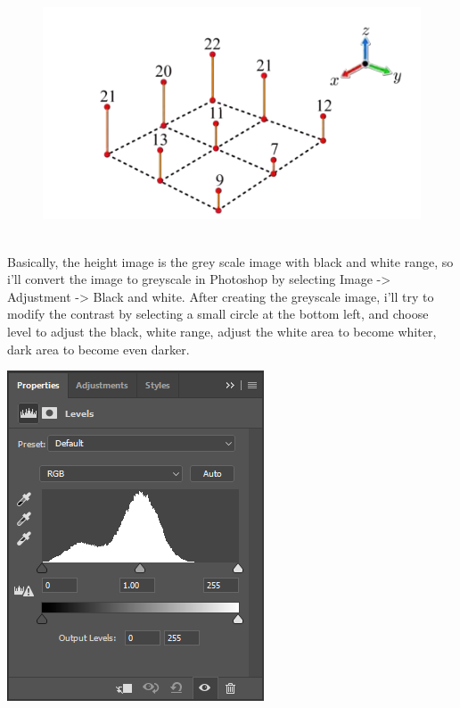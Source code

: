 \documentclass[a4paper, 13pt]{extarticle}
\begin{document}
\begin{figure}[h]
\begin{minipage}{.3\textwidth}
	 		\end{minipage}
 		\begin{minipage}{.3\textwidth}
 			\centering
 			\includegraphics[width=1.4\linewidth]{intructions/height_example.png}
 		\end{minipage}
 	\end{figure} 
 \\[0.02cm]
 Basically, the height image is the grey scale image with black and white range, so i'll convert the image to greyscale in Photoshop by selecting Image -> Adjustment -> Black and white. After creating the greyscale image, i'll try to modify the contrast by selecting a small circle at the bottom left, and choose level to adjust the black, white range, adjust the white area to become whiter, dark area to become even darker.
 \\[0.01cm]
 \noindent \begin{minipage}{0.21\textwidth}
 \includegraphics[width=\linewidth]{intructions/contrastAdjusting.png}
 \end{minipage}
\end{document}
